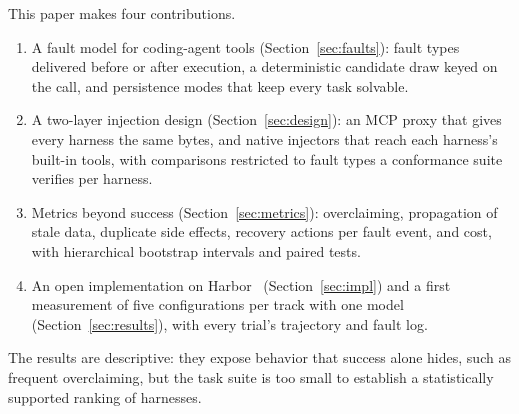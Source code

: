 This paper makes four contributions.
\begin{enumerate}
\item A fault model for coding-agent tools (Section~\ref{sec:faults}): fault types delivered before or after execution, a deterministic candidate draw keyed on the call, and persistence modes that keep every task solvable.
\item A two-layer injection design (Section~\ref{sec:design}): an MCP proxy that gives every harness the same bytes, and native injectors that reach each harness's built-in tools, with comparisons restricted to fault types a conformance suite verifies per harness.
\item Metrics beyond success (Section~\ref{sec:metrics}): overclaiming, propagation of stale data, duplicate side effects, recovery actions per fault event, and cost, with hierarchical bootstrap intervals and paired tests.
\item An open implementation on Harbor~\citep{harbor} (Section~\ref{sec:impl}) and a first measurement of five configurations per track with one model (Section~\ref{sec:results}), with every trial's trajectory and fault log.
\end{enumerate}
The results are descriptive: they expose behavior that success alone hides, such as frequent overclaiming, but the task suite is too small to establish a statistically supported ranking of harnesses.
